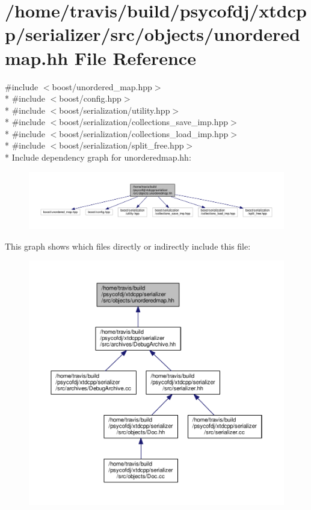 \hypertarget{unorderedmap_8hh}{\section{/home/travis/build/psycofdj/xtdcpp/serializer/src/objects/unorderedmap.hh File Reference}
\label{unorderedmap_8hh}
}
{\ttfamily \#include $<$boost/unordered\-\_\-map.\-hpp$>$}\\*
{\ttfamily \#include $<$boost/config.\-hpp$>$}\\*
{\ttfamily \#include $<$boost/serialization/utility.\-hpp$>$}\\*
{\ttfamily \#include $<$boost/serialization/collections\-\_\-save\-\_\-imp.\-hpp$>$}\\*
{\ttfamily \#include $<$boost/serialization/collections\-\_\-load\-\_\-imp.\-hpp$>$}\\*
{\ttfamily \#include $<$boost/serialization/split\-\_\-free.\-hpp$>$}\\*
Include dependency graph for unorderedmap.\-hh\-:
\nopagebreak
\begin{figure}[H]
\begin{center}
\leavevmode
\includegraphics[width=350pt]{unorderedmap_8hh__incl}
\end{center}
\end{figure}
This graph shows which files directly or indirectly include this file\-:
\nopagebreak
\begin{figure}[H]
\begin{center}
\leavevmode
\includegraphics[width=350pt]{unorderedmap_8hh__dep__incl}
\end{center}
\end{figure}
